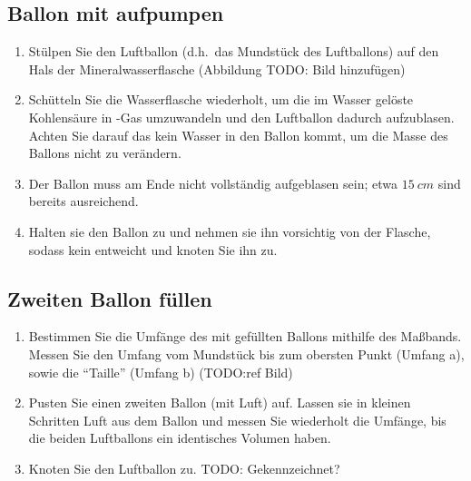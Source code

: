 \documentclass{article}
\begin{document}
        \subsection{Ballon mit \texorpdfstring{}{CO2} aufpumpen}
            \begin{enumerate}
                \item Stülpen Sie den Luftballon (d.h.\ das Mundstück des Luftballons) auf den Hals der Mineralwasserflasche (Abbildung TODO: Bild hinzufügen)
                \item Schütteln Sie die Wasserflasche wiederholt, um die im Wasser gelöste Kohlensäure in -Gas umzuwandeln und den Luftballon dadurch aufzublasen.
                Achten Sie darauf das kein Wasser in den Ballon kommt, um die Masse des Ballons nicht zu verändern.
                \item Der Ballon muss am Ende nicht vollständig aufgeblasen sein; etwa \(\SI{15}{cm}\) sind bereits ausreichend.
                \item Halten sie den Ballon zu und nehmen sie ihn vorsichtig von der Flasche, sodass kein  entweicht und knoten Sie ihn zu.
            \end{enumerate}
        
        \subsection{Zweiten Ballon füllen}
            \begin{enumerate}[resume]
                \item Bestimmen Sie die Umfänge des mit  gefüllten Ballons mithilfe des Maßbands.
                Messen Sie den Umfang vom Mundstück bis zum obersten Punkt (Umfang a), sowie die \enquote{Taille} (Umfang b) (TODO:ref Bild)
                \item Pusten Sie einen zweiten Ballon (mit Luft) auf. Lassen sie in kleinen Schritten Luft aus dem Ballon und messen Sie wiederholt die Umfänge,
                bis die beiden Luftballons ein identisches Volumen haben.
                \item Knoten Sie den Luftballon zu.
                TODO: Gekennzeichnet?
            \end{enumerate}
        
\end{document}
